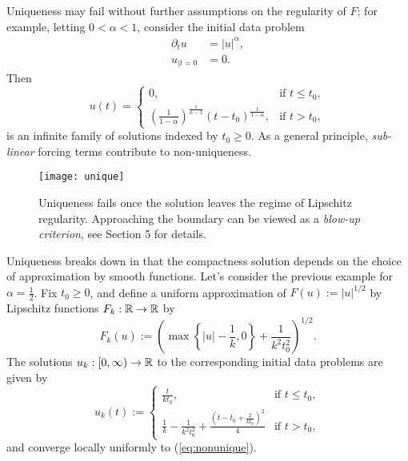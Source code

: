 \begin{remark}
	Uniqueness may fail without further assumptions on the regularity of $F$; for example, letting $0 < \alpha < 1$, consider the initial data problem
			\begin{align*}
				\partial_t u 	&= |u|^\alpha, \\
				u_{|t = 0}		&= 0.
			\end{align*}
	Then 
		\begin{equation}
			u (t) = 
				\begin{cases}
					0, 												&\text{if } t \leq t_0, \\
					\left(\frac{1}{1 - \alpha} \right)^{\frac{1}{\alpha - 1}} (t - t_0)^\frac{1}{1 - \alpha}, 	&\text{if } t > t_0,
				\end{cases} \tag{*} \label{eq:nonunique}
		\end{equation}
	is an infinite family of solutions indexed by $t_0 \geq 0$. As a general principle, \textit{sub-linear} forcing terms contribute to non-uniqueness. 
	
	
	\begin{figure}[h]
	\begin{center}
		\texttt{[image: unique]}
		\caption{Uniqueness fails once the solution leaves the regime of Lipschitz regularity. Approaching the boundary can be viewed as a \textit{blow-up criterion}, see Section 5 for details. }
	\end{center}
\end{figure}
\end{remark}

\begin{example}
	Uniqueness breaks down in that the compactness solution depends on the choice of approximation by smooth functions. Let's consider the previous example for $\alpha = \tfrac12$. Fix $t_0 \geq 0$, and define a uniform approximation of $F(u) := |u|^{1/2}$ by Lipschitz functions $F_k : \mathbb R \to \mathbb R$ by
		\[
			F_k (u) := \left( \max\left\{ |u| - \frac1k, 0 \right\} + \frac{1}{k^2 t_0^2} \right)^{1/2}.	
		\]
	The solutions $u_k : [0, \infty) \to \mathbb R$ to the corresponding initial data problems are given by 
		\[ u_k (t) 
			:= \begin{cases}
				\frac{t}{kt_0}, 
					&\text{if } t \leq t_0, \\
				\frac1k - \frac{1}{k^2 t_0^2} + \frac{(t - t_0 + \frac{2}{kt_0})^2}{4}
					&\text{if } t > t_0,
				\end{cases}	
		\]	
	and converge locally uniformly to (\ref{eq:nonunique}). 
\end{example}